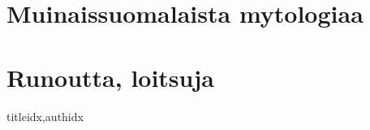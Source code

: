 \documentclass[twoside,10pt,finnish]{book}
\renewcommand{\lyricfont}{\sffamily\Large} %
\begin{document}
    \clearpage\scleardpage
    \section{Muinaissuomalaista mytologiaa}
      
    \clearpage\scleardpage
    \section{Runoutta, loitsuja}
      \begin{songs}{titleidx,authidx}
        \setcounter{songnum}{900}
        \chordsoff %
        \renewcommand{\lyricfont}{\sffamily\small} %
        
        \renewcommand{\lyricfont}{\sffamily\Large} %
        \chordson
      \end{songs}

  
  \clearpage
\end{document}
